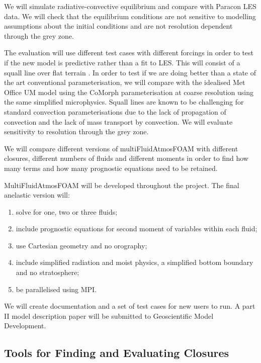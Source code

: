 \documentclass[11pt,a4paper]{article}
\begin{document}
We will simulate radiative-convective equilibrium and compare with Paracon LES data. We will check that the equilibrium conditions are not sensitive to modelling assumptions about the initial conditions and are not resolution dependent through the grey zone.



The evaluation will use different test cases with different forcings in order to test if the new model is predictive rather than a fit to LES. This will consist of a squall line over flat terrain \cite[]{FM06}. In order to test if we are doing better than a state of the art conventional parameterisation, we will compare with the idealised Met Office UM model using the CoMorph parameterisation at coarse resolution using the same simplified microphysics. Squall lines are known to be challenging for standard convection parameterisations \cite[e.g.][]{LCD+08} due to the lack of propagation of convection and the lack of mass transport by convection. We will evaluate sensitivity to resolution through the grey zone. 

We will compare different versions of multiFluidAtmosFOAM with different closures, different numbers of fluids and different moments in order to find how many terms and how many prognostic equations need to be retained. 


MultiFluidAtmosFOAM will be developed throughout the project. The final anelastic version will:
\begin{enumerate}
\item solve for one, two or three fluids;
\item include prognostic equations for second moment of variables within each fluid;
\item use Cartesian geometry and no orography;
\item include simplified radiation and moist physics, a simplified bottom boundary and no stratosphere;
\item be parallelised using MPI.
\end{enumerate}
We will create documentation and a set of test cases for new users to run. A part II model description paper will be submitted to Geoscientific Model Development.

\subsection{Tools for Finding and Evaluating Closures}
\label{sec:tools}
\end{document}
